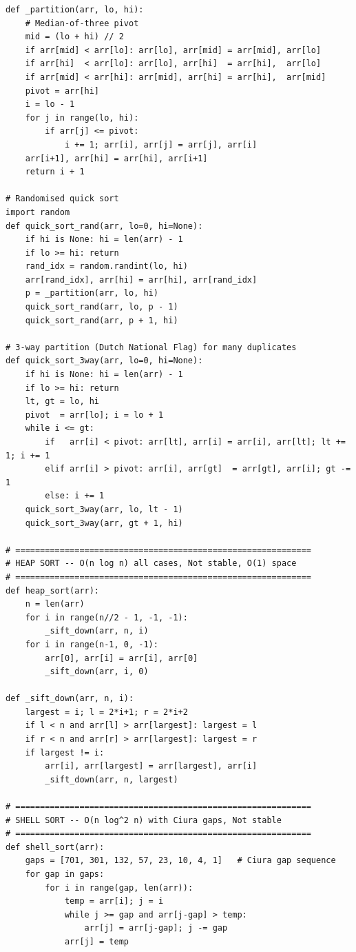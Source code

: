 \documentclass[11pt,a4paper]{report}
\begin{document}
\begin{lstlisting}
def _partition(arr, lo, hi):
    # Median-of-three pivot
    mid = (lo + hi) // 2
    if arr[mid] < arr[lo]: arr[lo], arr[mid] = arr[mid], arr[lo]
    if arr[hi]  < arr[lo]: arr[lo], arr[hi]  = arr[hi],  arr[lo]
    if arr[mid] < arr[hi]: arr[mid], arr[hi] = arr[hi],  arr[mid]
    pivot = arr[hi]
    i = lo - 1
    for j in range(lo, hi):
        if arr[j] <= pivot:
            i += 1; arr[i], arr[j] = arr[j], arr[i]
    arr[i+1], arr[hi] = arr[hi], arr[i+1]
    return i + 1

# Randomised quick sort
import random
def quick_sort_rand(arr, lo=0, hi=None):
    if hi is None: hi = len(arr) - 1
    if lo >= hi: return
    rand_idx = random.randint(lo, hi)
    arr[rand_idx], arr[hi] = arr[hi], arr[rand_idx]
    p = _partition(arr, lo, hi)
    quick_sort_rand(arr, lo, p - 1)
    quick_sort_rand(arr, p + 1, hi)

# 3-way partition (Dutch National Flag) for many duplicates
def quick_sort_3way(arr, lo=0, hi=None):
    if hi is None: hi = len(arr) - 1
    if lo >= hi: return
    lt, gt = lo, hi
    pivot  = arr[lo]; i = lo + 1
    while i <= gt:
        if   arr[i] < pivot: arr[lt], arr[i] = arr[i], arr[lt]; lt += 1; i += 1
        elif arr[i] > pivot: arr[i], arr[gt]  = arr[gt], arr[i]; gt -= 1
        else: i += 1
    quick_sort_3way(arr, lo, lt - 1)
    quick_sort_3way(arr, gt + 1, hi)

# ============================================================
# HEAP SORT -- O(n log n) all cases, Not stable, O(1) space
# ============================================================
def heap_sort(arr):
    n = len(arr)
    for i in range(n//2 - 1, -1, -1):
        _sift_down(arr, n, i)
    for i in range(n-1, 0, -1):
        arr[0], arr[i] = arr[i], arr[0]
        _sift_down(arr, i, 0)

def _sift_down(arr, n, i):
    largest = i; l = 2*i+1; r = 2*i+2
    if l < n and arr[l] > arr[largest]: largest = l
    if r < n and arr[r] > arr[largest]: largest = r
    if largest != i:
        arr[i], arr[largest] = arr[largest], arr[i]
        _sift_down(arr, n, largest)

# ============================================================
# SHELL SORT -- O(n log^2 n) with Ciura gaps, Not stable
# ============================================================
def shell_sort(arr):
    gaps = [701, 301, 132, 57, 23, 10, 4, 1]   # Ciura gap sequence
    for gap in gaps:
        for i in range(gap, len(arr)):
            temp = arr[i]; j = i
            while j >= gap and arr[j-gap] > temp:
                arr[j] = arr[j-gap]; j -= gap
            arr[j] = temp
\end{lstlisting}
\end{document}
